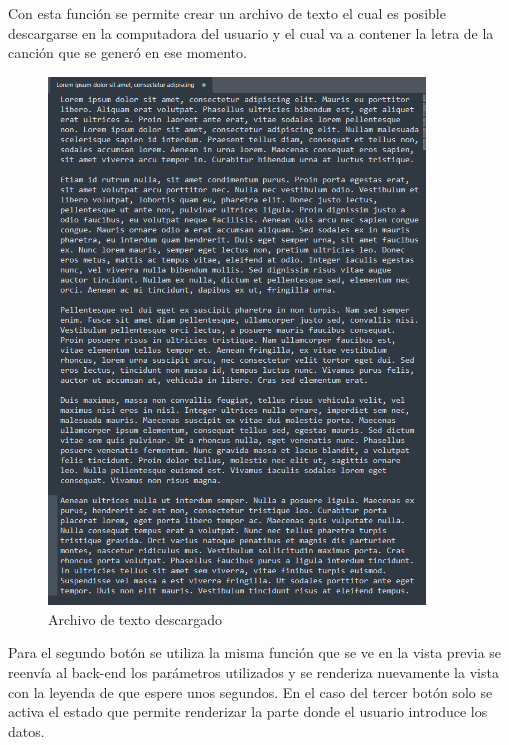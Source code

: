 \documentclass[12pt, a4paper, titlepage]{article}
\begin{document}
	\begin{center}
		
	\end{center}
	Con esta función se permite crear un archivo de texto el cual es posible descargarse en la computadora del usuario y el cual va a contener la letra de la canción que se generó en ese momento.
	\begin{figure}[H]
		\includegraphics[width=10cm]{./Imagenes/AplicacionWeb/Archivo.png}
		\centering 
		\caption{Archivo de texto descargado}
	\end{figure}	
	Para el segundo botón se utiliza la misma función que se ve en la vista previa se reenvía al back-end los parámetros utilizados y se renderiza nuevamente la vista con la leyenda de que espere unos segundos. En el caso del tercer botón solo se activa el estado que permite renderizar la parte donde el usuario introduce los datos.
	\newpage
\end{document}
